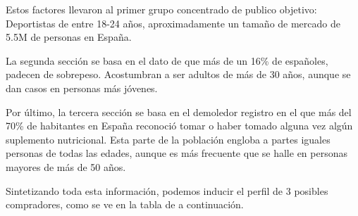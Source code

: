 \documentclass[11pt,a4paper]{report}
\begin{document}
\begin{figure}[htbp]
  \centering
  \begin{minipage}{0.48\textwidth}
    \centering
    \label{fig:pie-chart-1-mini}
  \end{minipage}
  \hfill
  \begin{minipage}{0.48\textwidth}
    \centering
    \label{fig:pie-chart-2-mini}
  \end{minipage}
\end{figure}


Estos factores llevaron al primer grupo concentrado de publico objetivo: Deportistas de entre 18-24 años, aproximadamente un tamaño de mercado de 5.5M de personas en España.

La segunda sección se basa en el dato de que más de un 16\% de españoles,  padecen de sobrepeso. Acostumbran a ser adultos de más de 30 años, aunque se dan casos en personas más jóvenes. 

Por último, la tercera sección se basa en el demoledor registro en el que más del 70\% de habitantes en España reconoció tomar o haber tomado alguna vez algún suplemento nutricional. Esta parte de la población engloba a partes iguales personas de todas las edades, aunque es más frecuente que se halle en personas mayores de más de 50 años.

Sintetizando toda esta información, podemos inducir el perfil de 3 posibles compradores, como se ve en la tabla de a continuación.
\end{document}
